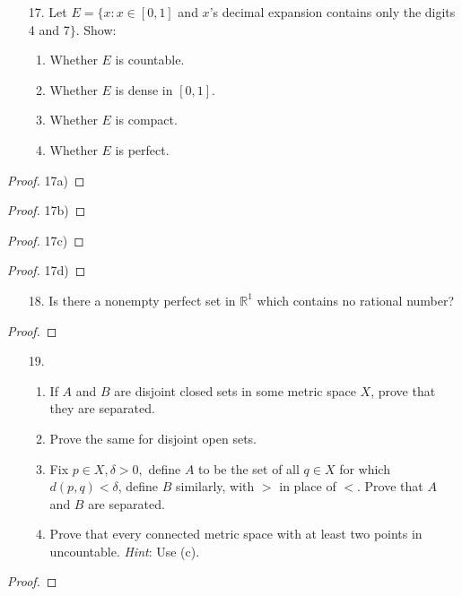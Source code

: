 \documentclass[10pt]{article}
\theoremstyle{definition}
\theoremstyle{plain}
\newcommand{\R}{\mathbb{R}}
\begin{document}
\begin{enumerate}
\item[17.] Let $E = \{x: x\in [0,1]$ and $x$'s decimal expansion contains only the digits 4 and 7$\}$. Show:
\begin{enumerate}
\item Whether $E$ is countable.
\item Whether $E$ is dense in $[0,1]$.
\item Whether $E$ is compact.
\item Whether $E$ is perfect.
\end{enumerate}
\end{enumerate}

\begin{proof}
17a)
\end{proof}

\begin{proof}
17b)
\end{proof}

\begin{proof}
17c)
\end{proof}

\begin{proof}
17d)
\end{proof}




\pagebreak




\begin{enumerate}
\item[18.] Is there a nonempty perfect set in $\R^1$ which contains no rational number?
\end{enumerate}

\begin{proof}

\end{proof}




\pagebreak




\begin{enumerate}
\item[19.]
\begin{enumerate}
\item If $A$ and $B$ are disjoint closed sets in some metric space $X$, prove that they are separated.
\item Prove the same for disjoint open sets.
\item Fix $p\in X, \delta >0,$ define $A$ to be the set of all $q\in X$ for which $d(p,q)<\delta$, define $B$ similarly, with $>$ in place of $<$. Prove that $A$ and $B$ are separated.
\item Prove that every connected metric space with at least two points in uncountable. \textit{Hint}: Use (c).
\end{enumerate}
\end{enumerate}

\begin{proof}

\end{proof}
\end{document}
